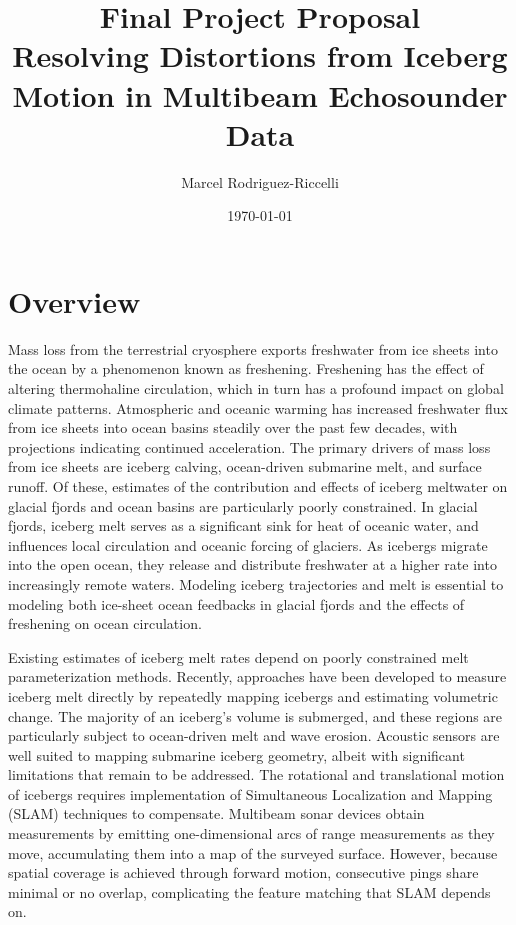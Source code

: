 \documentclass[12pt]{article}
\title{\textbf{Final Project Proposal}\\[0.4em]
       \large Resolving Distortions from Iceberg Motion in Multibeam Echosounder Data }
\author{Marcel Rodriguez-Riccelli}
\date{\today}
\begin{document}
\maketitle

\section*{Overview}

 Mass loss from the terrestrial cryosphere exports freshwater from ice sheets into the ocean by a phenomenon known as freshening. Freshening has the effect of altering thermohaline circulation, which in turn has a profound impact on global climate patterns. Atmospheric and oceanic warming has increased freshwater flux from ice sheets into ocean basins steadily over the past few decades, with projections indicating continued acceleration. The primary drivers of mass loss from ice sheets are iceberg calving, ocean-driven submarine melt, and surface runoff. Of these, estimates of the contribution and effects of iceberg meltwater on glacial fjords and ocean basins are particularly poorly constrained. In glacial fjords, iceberg melt serves as a significant sink for heat of oceanic water, and influences local circulation and oceanic forcing of glaciers. As icebergs migrate into the open ocean, they release and distribute freshwater at a higher rate into increasingly remote waters. Modeling iceberg trajectories and melt is essential to modeling both ice-sheet ocean feedbacks in glacial fjords and the effects of freshening on ocean circulation.
 
 Existing estimates of iceberg melt rates depend on poorly constrained melt parameterization methods. Recently, approaches have been developed to measure iceberg melt directly by repeatedly mapping icebergs and estimating volumetric change. The majority of an iceberg's volume is submerged, and these regions are particularly subject to ocean-driven melt and wave erosion. Acoustic sensors are well suited to mapping submarine iceberg geometry, albeit with significant limitations that remain to be addressed. The rotational and translational motion of icebergs requires implementation of Simultaneous Localization and Mapping (SLAM) techniques to compensate. Multibeam sonar devices obtain measurements by emitting one-dimensional arcs of range measurements as they move, accumulating them into a map of the surveyed surface. However, because spatial coverage is achieved through forward motion, consecutive pings share minimal or no overlap, complicating the feature matching that SLAM depends on.
\end{document}
